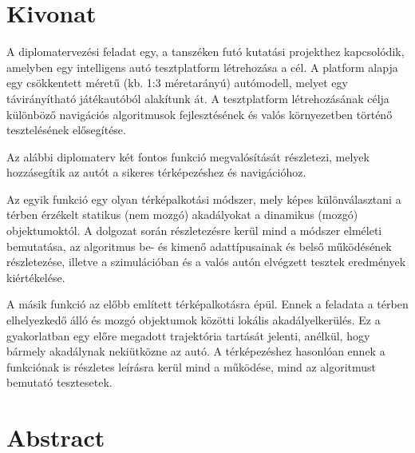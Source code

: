 \setcounter{page}{1}

\selecthungarian

\chapter*{Kivonat}

A diplomatervezési feladat egy, a tanszéken futó kutatási projekthez kapcsolódik, amelyben egy intelligens autó tesztplatform létrehozása a cél. A platform alapja egy csökkentett méretű (kb. 1:3 méretarányú) autómodell, melyet egy távirányítható játékautóból alakítunk át. A tesztplatform létrehozásának célja különböző navigációs algoritmusok fejlesztésének és valós környezetben történő tesztelésének elősegítése.

Az alábbi diplomaterv két fontos funkció megvalósítását részletezi, melyek hozzásegítik az autót a sikeres térképezéshez és navigációhoz.

Az egyik funkció egy olyan térképalkotási módszer, mely képes különválasztani a térben érzékelt statikus (nem mozgó) akadályokat a dinamikus (mozgó) objektumoktól. A dolgozat során részletezésre kerül mind a módszer elméleti bemutatása, az algoritmus be- és kimenő adattípusainak és belső működésének részletezése, illetve a szimulációban és a valós autón elvégzett tesztek eredmények kiértékelése.

A másik funkció az előbb említett térképalkotásra épül. Ennek a feladata a térben elhelyezkedő álló és mozgó objektumok közötti lokális akadályelkerülés. Ez a gyakorlatban egy előre megadott trajektória tartását jelenti, anélkül, hogy bármely akadálynak nekiütközne az autó. A térképezéshez hasonlóan ennek a funkciónak is részletes leírásra kerül mind a működése, mind az algoritmust bemutató tesztesetek.

\vfill
\selectenglish

\chapter*{Abstract}

